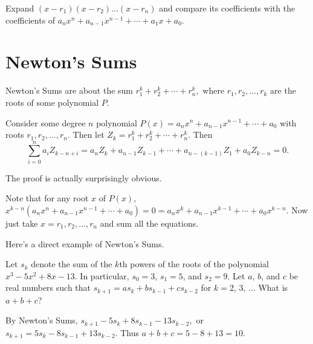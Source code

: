 \documentclass{article}
\begin{document}
\begin{pro}
Expand $(x-r_1)(x-r_2)\ldots(x-r_n)$ and compare its coefficients with the coefficients of $a_nx^n+a_{n-1}x^{n-1}+\cdots+a_{1}x+a_0.$
\end{pro}

\section{Newton's Sums}

Newton's Sums are about the sum $r_1^k+r_2^k+\cdots+r_n^k,$ where $r_1,r_2,\ldots,r_k$ are the roots of some polynomial $P.$

\begin{theo}
Consider some degree $n$ polynomial $P(x)=a_nx^n+a_{n-1}x^{n-1}+\cdots+a_0$ with roots $r_1,r_2,\ldots,r_n.$ Then let $Z_k=r_1^k+r_2^k+\cdots+r_n^k.$ Then
\[\sum_{i=0}^{n}a_iZ_{k-n+i}=a_nZ_k+a_{n-1}Z_{k-1}+\cdots+a_{n-(k-1)}Z_1+a_{0}Z_{k-n}=0.\]
\end{theo}

The proof is actually surprisingly obvious.

\begin{pro}
Note that for any root $x$ of $P(x),$ $x^{k-n}(a_nx^n+a_{n-1}x^{n-1}+\cdots+a_0)=0=a_nx^k+a_{n-1}x^{k-1}+\cdots+a_0x^{k-n}.$ Now just take $x=r_1,r_2,\ldots,r_n$ and sum all the equations.
\end{pro}

Here's a direct example of Newton's Sums.

\begin{exam}[AMC 12A 2019/17]
Let $s_k$ denote the sum of the $\textit{k}$th powers of the roots of the polynomial $x^3-5x^2+8x-13$. In particular, $s_0=3$, $s_1=5$, and $s_2=9$. Let $a$, $b$, and $c$ be real numbers such that $s_{k+1} = as_k + bs_{k-1} + cs_{k-2}$ for $k=2$, $3$, $\ldots$ What is $a+b+c$?
\end{exam}


\begin{sol}
By Newton's Sums, $s_{k+1}-5s_k+8s_{k-1}-13s_{k-2},$ or $s_{k+1}=5s_k-8s_{k-1}+13s_{k-2}.$ Thus $a+b+c=5-8+13=10.$
\end{sol}

\pagebreak

\end{document}

